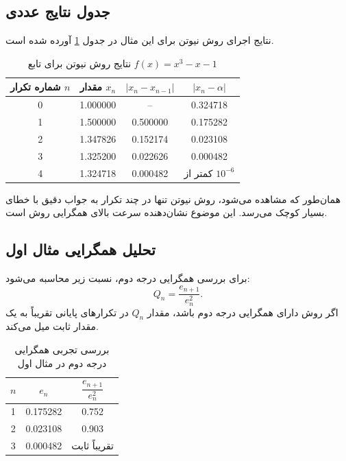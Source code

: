 \subsection{جدول نتایج عددی}

نتایج اجرای روش نیوتن برای این مثال در جدول \ref{tab:newton-example1} آورده شده است.

\begin{table}[H]
\centering
\caption{نتایج روش نیوتن برای تابع $f(x)=x^3-x-1$}
\label{tab:newton-example1}
\renewcommand{\arraystretch}{1.35}
\begin{tabular}{c c c c}
\toprule[1.3pt]
شماره تکرار $n$ & مقدار $x_n$ & $|x_n-x_{n-1}|$ & $|x_n-\alpha|$ \\
\midrule[1pt]
0 & 1.000000 & -- & 0.324718 \\
1 & 1.500000 & 0.500000 & 0.175282 \\
2 & 1.347826 & 0.152174 & 0.023108 \\
3 & 1.325200 & 0.022626 & 0.000482 \\
4 & 1.324718 & 0.000482 & کمتر از $10^{-6}$ \\
\bottomrule[1.3pt]
\end{tabular}
\end{table}

همان‌طور که مشاهده می‌شود، روش نیوتن تنها در چند تکرار به جواب دقیق با خطای بسیار کوچک می‌رسد. این موضوع نشان‌دهنده سرعت بالای همگرایی روش است.

\subsection{تحلیل همگرایی مثال اول}

برای بررسی همگرایی درجه دوم، نسبت زیر محاسبه می‌شود:
\begin{equation}
Q_n=\frac{e_{n+1}}{e_n^2}.
\label{eq:ch4-qn}
\end{equation}
اگر روش دارای همگرایی درجه دوم باشد، مقدار $Q_n$ در تکرارهای پایانی تقریباً به یک مقدار ثابت میل می‌کند.

\begin{table}[H]
\centering
\caption{بررسی تجربی همگرایی درجه دوم در مثال اول}
\label{tab:quadratic-example1}
\renewcommand{\arraystretch}{1.35}
\begin{tabular}{c c c}
\toprule[1.3pt]
$n$ & $e_n$ & $\dfrac{e_{n+1}}{e_n^2}$ \\
\midrule[1pt]
1 & 0.175282 & 0.752 \\
2 & 0.023108 & 0.903 \\
3 & 0.000482 & تقریباً ثابت \\
\bottomrule[1.3pt]
\end{tabular}
\end{table}

